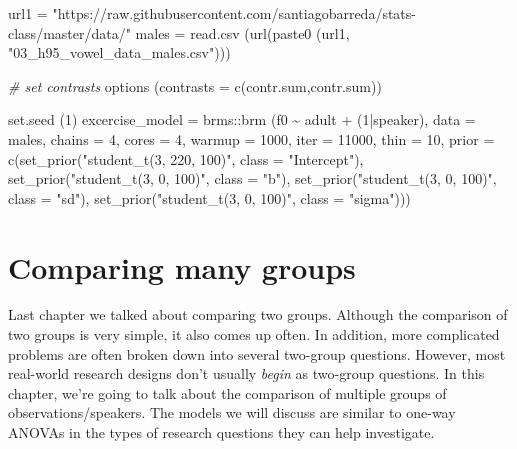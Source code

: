 \documentclass[
]{book}
\newenvironment{Shaded}{\begin{snugshade}}{\end{snugshade}}
\newcommand{\AttributeTok}[1]{\textcolor[rgb]{0.77,0.63,0.00}{#1}}
\newcommand{\CommentTok}[1]{\textcolor[rgb]{0.56,0.35,0.01}{\textit{#1}}}
\newcommand{\DecValTok}[1]{\textcolor[rgb]{0.00,0.00,0.81}{#1}}
\newcommand{\FunctionTok}[1]{\textcolor[rgb]{0.00,0.00,0.00}{#1}}
\newcommand{\NormalTok}[1]{#1}
\newcommand{\OtherTok}[1]{\textcolor[rgb]{0.56,0.35,0.01}{#1}}
\newcommand{\SpecialCharTok}[1]{\textcolor[rgb]{0.00,0.00,0.00}{#1}}
\newcommand{\StringTok}[1]{\textcolor[rgb]{0.31,0.60,0.02}{#1}}
\begin{document}
\begin{Shaded}
\begin{Highlighting}[]
\NormalTok{url1 }\OtherTok{=} \StringTok{"https://raw.githubusercontent.com/santiagobarreda/stats{-}class/master/data/"}
\NormalTok{males }\OtherTok{=} \FunctionTok{read.csv}\NormalTok{ (}\FunctionTok{url}\NormalTok{(}\FunctionTok{paste0}\NormalTok{ (url1, }\StringTok{"03\_h95\_vowel\_data\_males.csv"}\NormalTok{)))}

\CommentTok{\# set contrasts}
\FunctionTok{options}\NormalTok{ (}\AttributeTok{contrasts =} \FunctionTok{c}\NormalTok{(}\StringTok{\textquotesingle{}contr.sum\textquotesingle{}}\NormalTok{,}\StringTok{\textquotesingle{}contr.sum\textquotesingle{}}\NormalTok{))}

\FunctionTok{set.seed}\NormalTok{ (}\DecValTok{1}\NormalTok{)}
\NormalTok{excercise\_model }\OtherTok{=}  
\NormalTok{  brms}\SpecialCharTok{::}\FunctionTok{brm}\NormalTok{ (f0 }\SpecialCharTok{\textasciitilde{}}\NormalTok{ adult }\SpecialCharTok{+}\NormalTok{ (}\DecValTok{1}\SpecialCharTok{|}\NormalTok{speaker), }\AttributeTok{data =}\NormalTok{ males, }\AttributeTok{chains =} \DecValTok{4}\NormalTok{, }\AttributeTok{cores =} \DecValTok{4}\NormalTok{,}
       \AttributeTok{warmup =} \DecValTok{1000}\NormalTok{, }\AttributeTok{iter =} \DecValTok{11000}\NormalTok{, }\AttributeTok{thin =} \DecValTok{10}\NormalTok{,}
       \AttributeTok{prior =} \FunctionTok{c}\NormalTok{(}\FunctionTok{set\_prior}\NormalTok{(}\StringTok{"student\_t(3, 220, 100)"}\NormalTok{, }\AttributeTok{class =} \StringTok{"Intercept"}\NormalTok{),}
                 \FunctionTok{set\_prior}\NormalTok{(}\StringTok{"student\_t(3, 0, 100)"}\NormalTok{, }\AttributeTok{class =} \StringTok{"b"}\NormalTok{),}
                 \FunctionTok{set\_prior}\NormalTok{(}\StringTok{"student\_t(3, 0, 100)"}\NormalTok{, }\AttributeTok{class =} \StringTok{"sd"}\NormalTok{),}
                 \FunctionTok{set\_prior}\NormalTok{(}\StringTok{"student\_t(3, 0, 100)"}\NormalTok{, }\AttributeTok{class =} \StringTok{"sigma"}\NormalTok{)))}
\end{Highlighting}
\end{Shaded}

\hypertarget{comparing-many-groups}{%
\chapter{Comparing many groups}\label{comparing-many-groups}}

Last chapter we talked about comparing two groups. Although the comparison of two groups is very simple, it also comes up often. In addition, more complicated problems are often broken down into several two-group questions. However, most real-world research designs don't usually \emph{begin} as two-group questions. In this chapter, we're going to talk about the comparison of multiple groups of observations/speakers. The models we will discuss are similar to one-way ANOVAs in the types of research questions they can help investigate.
\end{document}
